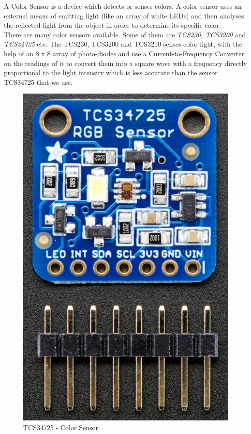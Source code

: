 \documentclass[a4paper,11pt,twocolumn]{article}
\begin{document}
A Color Sensor is a device which detects or senses colors. A color sensor uses an external means of emitting light (like an array of white LEDs) and then analyses the reflected light from the object in order to determine its specific color.\\
There are many color sensors available. Some of them are \textit{TCS230, TCS3200} and \textit{TCS34725} etc. The TCS230, TCS3200 and TCS3210 senses color light, with the help of an 8 x 8 array of photo-diodes\cite{dejan_arduino_2016} and use a Current-to-Frequency Converter on the readings of it to  convert them into a square wave with a frequency directly proportional to the light intensity which is less accurate than the sensor TCS34725 that we use.\\ 
\begin{center}
	\begin{figure}[!h]
		\centering
		\includegraphics[scale=0.3]{figures/color}
		\caption{TCS34725 - Color Sensor}
	\end{figure}
\end{center}
\end{document}
